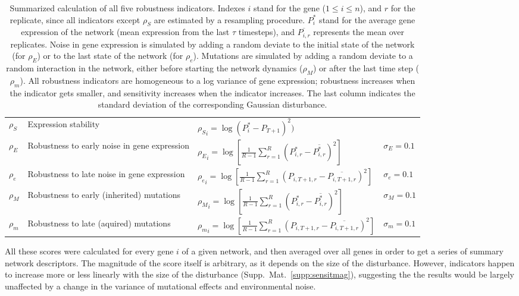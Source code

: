 \documentclass[10pt,a4paper]{article}
\newcommand{\stability}{{\rho_S}}
\newcommand{\earlyenv}{{\rho_E}}
\newcommand{\lateenv}{{\rho_e}}
\newcommand{\earlymut}{{\rho_M}}
\newcommand{\latemut}{{\rho_m}}
\begin{document}
\begin{table}
\begin{adjustwidth}{-1in}{0in}
\begin{flushright}
\begin{tabular}{lp{4cm}ll}
$\stability$ & Expression stability & $\stability_i = \log( P_i^* - P_{T+1})^2)$ & \\
$\earlyenv$ & Robustness to early noise in gene expression & $\earlyenv_i = \log [ \frac{1}{R-1} \sum_{r=1}^R (P_{i,r}^* - \overline{P_{i,r}^*})^2 ]$ & $\sigma_E=0.1$\\
$\lateenv$  & Robustness to late noise in gene expression & $\lateenv_i = \log [ \frac{1}{R-1} \sum_{r=1}^R (P_{i,T+1,r} - \overline{P_{i,T+1,r}})^2]$ & $\sigma_e=0.1$\\
$\earlymut$ & Robustness to early (inherited) mutations & $\earlymut_i = \log[ \frac{1}{R-1} \sum_{r=1}^R (P_{i,r}^* - \overline{P_{i,r}^*})^2]$ & $\sigma_M = 0.1$\\
$\latemut$ & Robustness to late (aquired) mutations & $\latemut_i = \log [ \frac{1}{R-1} \sum_{r=1}^R (P_{i,T+1,r} - \overline{P_{i,T+1,r}})^2]$ & $\sigma_m = 0.1$ 
\end{tabular}
\caption{\color{Gray}  \label{tab:indicators} Summarized calculation of all five robustness indicators. Indexes $i$ stand for the gene ($1 \leq i \leq n$), and $r$ for the replicate, since all indicators except $\stability$ are estimated by a resampling procedure. $P_i^*$ stand for the average gene expression of the network (mean expression from the last $\tau$ timesteps), and $\overline{P_{i,r}}$ represents the mean over replicates. Noise in gene expression is simulated by adding a random deviate to the initial state of the network (for $\earlyenv$) or to the last state of the network (for $\lateenv$). Mutations are simulated by adding a random deviate to a random interaction in the network, either before starting the network dynamics ($\earlymut$) or after the last time step ($\latemut$). All robustness indicators are homogeneous to a log variance of gene expression; robustness increases when the indicator gets smaller, and sensitivity increases when the indicator increases. The last column indicates the standard deviation of the corresponding Gaussian disturbance. }
\end{flushright}\end{adjustwidth}
\end{table}

All these scores were calculated for every gene $i$ of a given network, and then averaged over all genes in order to get a series of summary network descriptors. The magnitude of the score itself is arbitrary, as it depends on the size of the disturbance. However, indicators happen to increase more or less linearly with the size of the disturbance (Supp.\ Mat.\ \ref{supp:sensitmag}), suggesting the the results would be largely unaffected by a change in the variance of mutational effects and environmental noise. 
\end{document}

